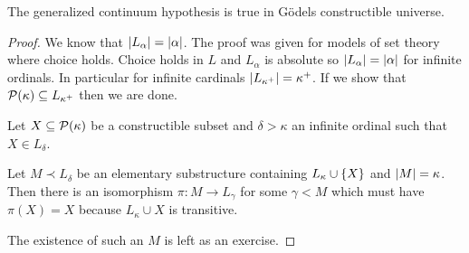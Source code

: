 \begin{theorem}
    The generalized continuum hypothesis is true in Gödels constructible
    universe.

    \begin{proof}
        We know that \(\lvert L_{\alpha}\rvert=\lvert\alpha\rvert\). The proof was given for
        models of set theory where choice holds. Choice holds in \(L\) and
        \(L_{\alpha}\) is absolute so \(\lvert L_{\alpha}\rvert=\lvert\alpha\rvert\) for
        infinite ordinals. In particular for infinite cardinals
        \(\lvert L_{\kappa^{+}}\rvert=\kappa^{+}\). If we show that
        \(\mathcal{P}(\kappa)\subseteq L_{\kappa^{+}}\) then we are done.

        Let \(X\subseteq\mathcal{P}(\kappa)\) be a constructible subset and
        \(\delta>\kappa\) an infinite ordinal such that \(X\in L_{\delta}\).

        Let \(M\prec L_{\delta}\) be an elementary substructure containing
        \(L_{\kappa}\cup\left\{X\right\}\) and \(\lvert M\rvert=\kappa\). Then there is an
        isomorphism \(\pi:M\to L_{\gamma}\) for some \(\gamma<M\) which must
        have \(\pi(X)=X\) because \(L_{\kappa}\cup X\) is transitive.

        The existence of such an \(M\) is left as an exercise.
    \end{proof}
\end{theorem}